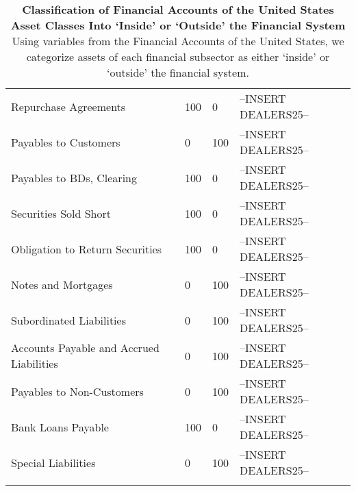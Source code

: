 \begin{longtable}{>{\raggedright}p{10cm}>{\raggedright}p{1cm}>{\raggedright}p{1cm}>{\raggedright}p{4cm}}
\multicolumn{3}{l}{Top 25 Dealers, FOCUS (Liabilities)}\tabularnewline
\hline 
\hspace*{0.5cm} Repurchase Agreements & 100 & 0 & --INSERT DEALERS25-- \tabularnewline  
\hspace*{0.5cm} Payables to Customers & 0 & 100 & --INSERT DEALERS25-- \tabularnewline  
\hspace*{0.5cm} Payables to BDs, Clearing & 100 & 0 & --INSERT DEALERS25-- \tabularnewline  
\hspace*{0.5cm} Securities Sold Short & 100 & 0 & --INSERT DEALERS25-- \tabularnewline
\hspace*{0.5cm} Obligation to Return Securities & 100 & 0 & --INSERT DEALERS25-- \tabularnewline
\hspace*{0.5cm} Notes and Mortgages & 0 & 100 & --INSERT DEALERS25-- \tabularnewline  
\hspace*{0.5cm} Subordinated Liabilities & 0 & 100 & --INSERT DEALERS25-- \tabularnewline
\hspace*{0.5cm} Accounts Payable and Accrued Liabilities & 0 & 100 & --INSERT DEALERS25-- \tabularnewline  
\hspace*{0.5cm} Payables to Non-Customers & 0 & 100 & --INSERT DEALERS25-- \tabularnewline  
\hspace*{0.5cm} Bank Loans Payable & 100 & 0 & --INSERT DEALERS25-- \tabularnewline  
\hspace*{0.5cm} Special Liabilities & 0 & 100 & --INSERT DEALERS25-- \tabularnewline
\hline 

\hline
\caption{\textbf{Classification of Financial Accounts of the United States Asset Classes
Into `Inside' or `Outside' the Financial System} Using variables from the Financial Accounts of the United States, we categorize assets of each financial subsector as either `inside' or `outside' the financial system.}
\end{longtable}

